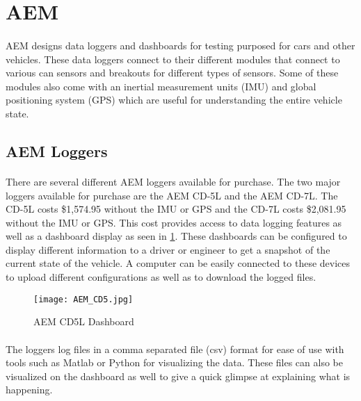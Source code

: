 \section{AEM}

\paragraph{}
AEM \cite{AEMSite} designs data loggers and dashboards for testing purposed for cars and other vehicles.
These data loggers connect to their different modules that connect to various can sensors and breakouts for different types of sensors.
Some of these modules also come with an inertial measurement units (IMU) and global positioning system (GPS) which are useful for understanding the entire vehicle state.

\subsection{AEM Loggers}

\paragraph{}
There are several different AEM loggers available for purchase.
The two major loggers available for purchase are the AEM CD-5L and the AEM CD-7L.
The CD-5L costs \$1,574.95 without the IMU or GPS and the CD-7L costs \$2,081.95 without the IMU or GPS.
This cost provides access to data logging features as well as a dashboard display as seen in \cref{fig:AEM_CD5}.
These dashboards can be configured to display different information to a driver or engineer to get a snapshot of the current state of the vehicle.
A computer can be easily connected to these devices to upload different configurations as well as to download the logged files.

\begin{figure}[H]
	\centering
	\texttt{[image: AEM\_CD5.jpg]}
	\caption{AEM CD5L Dashboard}
	\label{fig:AEM_CD5}
\end{figure}

\paragraph{}
The loggers log files in a comma separated file (csv) format for ease of use with tools such as Matlab or Python for visualizing the data.
These files can also be visualized on the dashboard as well to give a quick glimpse at explaining what is happening.

